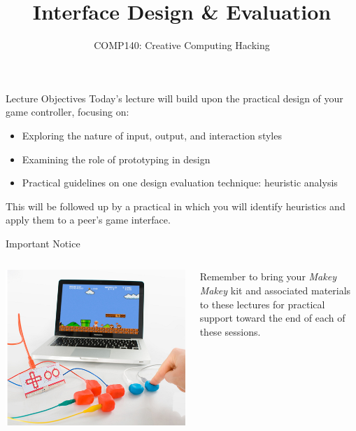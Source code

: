 \documentclass[xcolor={dvipsnames}]{beamer}\usepackage{etoolbox}\newtoggle{printable}\togglefalse{printable}
\begin{document}
\title{Interface Design \& Evaluation}   
\subtitle{COMP140: Creative Computing Hacking}

\frame{\titlepage} 

\begin{frame}{Lecture Objectives}
	Today's lecture will build upon the practical design of your game controller, focusing on:
	
	\begin{itemize}
		\item Exploring the nature of  input, output, and interaction styles
		\item Examining the role of prototyping in design
		\item Practical guidelines on one design evaluation technique: heuristic analysis
	\end{itemize}
	
	This will be followed up by a practical in which you will identify heuristics and apply them to a peer's game interface.
\end{frame}

\begin{frame}{Important Notice}
	\begin{columns}[onlytextwidth]
		\begin{column}{0.45\textwidth}
			\includegraphics[height=22ex]{MakeyMakey.jpg}
		\end{column}
		\begin{column}{0.45\textwidth}
			Remember to bring your \textit{Makey Makey} kit and associated materials to these lectures for practical 
			support toward the end of each of these sessions.
		\end{column}
	\end{columns}
\end{frame}







%
\end{document}
